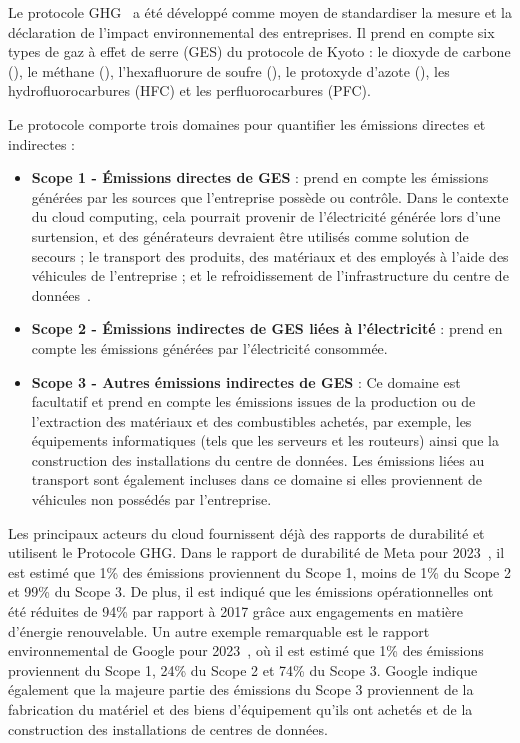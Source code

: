 \label{sec:measuring_environmental_impact_resume}


Le protocole GHG~\cite{ghgprotocol2004} a été développé comme moyen de standardiser la mesure et la déclaration de l'impact environnemental des entreprises. Il prend en compte six types de gaz à effet de serre (GES) du protocole de Kyoto : le dioxyde de carbone (), le méthane (), l'hexafluorure de soufre (), le protoxyde d'azote (), les hydrofluorocarbures (HFC) et les perfluorocarbures (PFC).


Le protocole comporte trois domaines pour quantifier les émissions directes et indirectes :

\begin{itemize}
\item \textbf{Scope 1 - Émissions directes de GES} : prend en compte les émissions générées par les sources que l'entreprise possède ou contrôle. Dans le contexte du cloud computing, cela pourrait provenir de l'électricité générée lors d'une surtension, et des générateurs devraient être utilisés comme solution de secours ; le transport des produits, des matériaux et des employés à l'aide des véhicules de l'entreprise ; et le refroidissement de l'infrastructure du centre de données~\cite{gupta2021_chasingcarbon}.
\item \textbf{Scope 2 - Émissions indirectes de GES liées à l'électricité} : prend en compte les émissions générées par l'électricité consommée.
\item \textbf{Scope 3 - Autres émissions indirectes de GES} : Ce domaine est facultatif et prend en compte les émissions issues de la production ou de l'extraction des matériaux et des combustibles achetés, par exemple, les équipements informatiques (tels que les serveurs et les routeurs) ainsi que la construction des installations du centre de données. Les émissions liées au transport sont également incluses dans ce domaine si elles proviennent de véhicules non possédés par l'entreprise.
\end{itemize}  

Les principaux acteurs du cloud fournissent déjà des rapports de durabilité et utilisent le Protocole GHG. Dans le rapport de durabilité de Meta pour 2023~\cite{meta_sustainability_report_2023}, il est estimé que 1\% des émissions proviennent du Scope 1, moins de 1\% du Scope 2 et 99\% du Scope 3. De plus, il est indiqué que les émissions opérationnelles ont été réduites de 94\% par rapport à 2017 grâce aux engagements en matière d'énergie renouvelable. Un autre exemple remarquable est le rapport environnemental de Google pour 2023~\cite{google_sustainability_report_2023}, où il est estimé que 1\% des émissions proviennent du Scope 1, 24\% du Scope 2 et 74\% du Scope 3. Google indique également que la majeure partie des émissions du Scope 3 proviennent de la fabrication du matériel et des biens d'équipement qu'ils ont achetés et de la construction des installations de centres de données.

